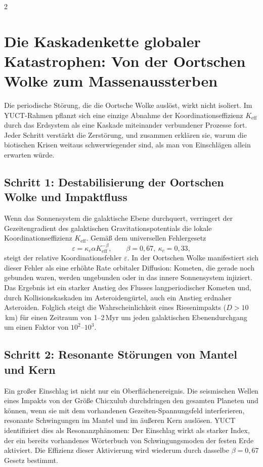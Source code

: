 \documentclass[11pt,a4paper]{article}
\begin{document}
	\begin{multicols}{2}
		
		\section{Die Kaskadenkette globaler Katastrophen: Von der Oortschen Wolke zum Massenaussterben}
		
		Die periodische Störung, die die Oortsche Wolke auslöst, wirkt nicht isoliert.
		Im YUCT-Rahmen pflanzt sich eine einzige Abnahme der Koordinationseffizienz \(K_{\mathrm{eff}}\)
		durch das Erdsystem als eine Kaskade miteinander verbundener Prozesse fort.
		Jeder Schritt verstärkt die Zerstörung, und zusammen erklären sie, warum die biotischen Krisen weitaus schwerwiegender sind, als man von Einschlägen allein erwarten würde.
		
		\subsection{Schritt 1: Destabilisierung der Oortschen Wolke und Impaktfluss}
		
		Wenn das Sonnensystem die galaktische Ebene durchquert, verringert der Gezeitengradient des
		galaktischen Gravitationspotentials die lokale Koordinationseffizienz
		\(K_{\mathrm{eff}}\). Gemäß dem universellen Fehlergesetz
		\begin{equation}
			\varepsilon = \kappa_c \alpha K_{\mathrm{eff}}^{-\beta},\qquad \beta=0,67,\ \kappa_c=0,33,
		\end{equation}
		steigt der relative Koordinationsfehler \(\varepsilon\). In der Oortschen Wolke
		manifestiert sich dieser Fehler als eine erhöhte Rate orbitaler Diffusion: Kometen, die
		gerade noch gebunden waren, werden ungebunden oder in das innere Sonnensystem injiziert.
		Das Ergebnis ist ein starker Anstieg des Flusses langperiodischer Kometen und, durch
		Kollisionskaskaden im Asteroidengürtel, auch ein Anstieg erdnaher Asteroiden. Folglich steigt die Wahrscheinlichkeit eines Riesenimpakts
		(\(D>10\) km) für einen Zeitraum von 1–2 Myr um jeden galaktischen Ebenendurchgang um einen Faktor von \(10^2\)–\(10^3\).
		
		\subsection{Schritt 2: Resonante Störungen von Mantel und Kern}
		
		Ein großer Einschlag ist nicht nur ein Oberflächenereignis. Die seismischen Wellen eines
		Impakts von der Größe Chicxulub durchdringen den gesamten Planeten und können, wenn sie
		mit dem vorhandenen Gezeiten-Spannungsfeld interferieren, resonante Schwingungen im Mantel und im äußeren Kern auslösen. YUCT identifiziert dies als Resonanzphänomen: Der Einschlag wirkt als starker Index, der ein bereits vorhandenes Wörterbuch von Schwingungsmoden der festen Erde aktiviert. Die Effizienz dieser Aktivierung wird wiederum durch dasselbe \(\beta = 0,67\) Gesetz bestimmt.
		

\end{multicols}
\end{document}
